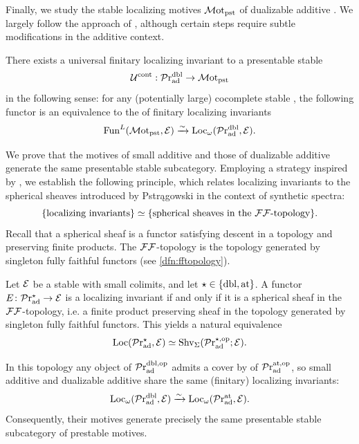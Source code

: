\documentclass[a4paper,10pt, oneside]{amsart}
\begin{document}
Finally, we study the stable localizing motives $\mathcal{M}\mathrm{ot}_{\mathrm{pst}}$ of dualizable additive \infcats. We largely follow the approach of \cite{blumberg2013universal}, although certain steps require subtle modifications in the additive context. 
\begin{thmX}
	There exists a  universal finitary localizing invariant to a presentable stable \infcat $$\mathcal{U}^{\mathrm{cont}}:\mathcal{P}\mathrm{r}_{\mathrm{ad}}^{\mathrm{dbl}}\to \mathcal{M}\mathrm{ot}_{\mathrm{pst}}$$ in the following sense: for any (potentially large) cocomplete stable \infcat \mce, the following functor is an equivalence to the \infcat of finitary localizing invariants
	$$\operatorname{Fun}^L(\mathcal{M}\mathrm{ot}_{\mathrm{pst}},\mathcal{E})\xrightarrow{\sim}\operatorname{Loc}_\omega(\mathcal{P}\mathrm{r}_{\mathrm{ad}}^{\mathrm{dbl}},\mathcal{E}).$$
\end{thmX}
We prove that the motives of small additive \infcats and those of dualizable additive \infcats generate the same presentable stable subcategory. 
Employing a strategy inspired by \cite[Theorem 4.10]{efimov2024k}, we establish the following principle, which relates localizing invariants to the spherical sheaves introduced by Pstrągowski \cite{pstrkagowski2023synthetic} in the context of synthetic spectra:
\[
\{\text{localizing invariants}\} \simeq \{\text{spherical sheaves in the $\mathcal{F}\mathcal{F}$-topology}\}.
\]
Recall that a spherical sheaf is a functor satisfying descent in a topology and
preserving finite products. The $\mathcal{F}\mathcal{F}$-topology is the topology generated by singleton
fully faithful functors (see \cref{dfn:fftopology}).
\begin{thmX}\label{thm:sphericalsheaves}
	Let $\mathcal{E}$ be a stable \infcat with small colimits, and let 
	$\star \in \{ \mathrm{dbl}, \mathrm{at} \}$. A functor $E \colon \mathcal{P}\mathrm{r}_{\mathrm{ad}}^\star \to \mathcal{E}$ is a 
	localizing invariant if and only if it is a spherical sheaf in the $\mathcal{F}\mathcal{F}$-topology, 
	i.e. a finite product preserving sheaf in the topology generated by singleton fully 
	faithful functors. This yields a natural equivalence
	\[
	\mathrm{Loc}(\mathcal{P}\mathrm{r}_{\mathrm{ad}}^\star,\mathcal{E})\simeq \operatorname{Shv}_\Sigma(\mathcal{P}\mathrm{r}_{\mathrm{ad}}^{\star,\mathrm{op}};\mathcal{E}).
	\]
	
	In this topology any object of $\mathcal{P}\mathrm{r}_{\mathrm{ad}}^{\mathrm{dbl},\mathrm{op}}$ admits a cover by of $\mathcal{P}\mathrm{r}_{\mathrm{ad}}^{\mathrm{at},\mathrm{op}}$, 
	so small additive %
	\infcats and dualizable additive \infcats share the same (finitary) localizing invariants:
	\[
	\mathrm{Loc}_{\omega}(\mathcal{P}\mathrm{r}_{\mathrm{ad}}^{\mathrm{dbl}},\mathcal{E})\xrightarrow{\sim} \mathrm{Loc}_{\omega}(\mathcal{P}\mathrm{r}_{\mathrm{ad}}^{\mathrm{at}},\mathcal{E}).
	\]
	Consequently, their motives generate precisely the same presentable stable subcategory of prestable motives.
\end{thmX}
\end{document}

